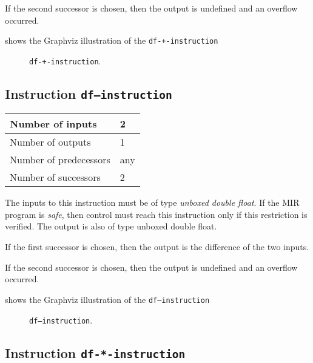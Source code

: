 If the second successor is chosen, then the output is undefined and an
overflow occurred. 

 shows the Graphviz illustration of the
\texttt{df-+-instruction}

\begin{figure}
\begin{center}
\end{center}
\caption{\label{fig-df-+-instruction}
\texttt{df-+-instruction}.}
\end{figure}

\subsection{Instruction \texttt{df---instruction}}
\label{mir-instruction-df--}

\begin{tabular}{|l|l|}
\hline
Number of inputs & 2\\
\hline
Number of outputs & 1\\
\hline
Number of predecessors & any\\
\hline
Number of successors & 2\\
\hline
\end{tabular}

The inputs to this instruction must be of type \emph{unboxed double
  float}.  If the MIR program is \emph{safe}, then control must reach
this instruction only if this restriction is verified.  The output is
also of type unboxed double float.

If the first successor is chosen, then the output is
the difference of the two inputs.  

If the second successor is chosen, then the output is undefined and an
overflow occurred. 

 shows the Graphviz illustration of the
\texttt{df---instruction}

\begin{figure}
\begin{center}
\end{center}
\caption{\label{fig-df---instruction}
\texttt{df---instruction}.}
\end{figure}

\subsection{Instruction \texttt{df-*-instruction}}
\label{mir-instruction-df-*}

